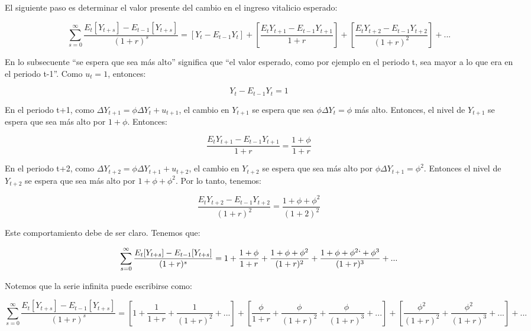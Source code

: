 \documentclass[
]{article}
\begin{document}
El siguiente paso es determinar el valor presente del cambio en el
ingreso vitalicio esperado:

\begin{equation}
\sum^\infty_{s=0}\frac{E_t[Y_{t+s}]-E_{t-1}[Y_{t+s}]}{(1+r)^s}=[Y_t-E_{t-1}Y_t]+[\frac{E_tY_{t+1}-E_{t-1}Y_{t+1}}{1+r}]+[\frac{E_tY_{t+2}-E_{t-1}Y_{t+2}}{(1+r)^2}]+...
\end{equation}

En lo subsecuente ``se espera que sea más alto'' significa que ``el
valor esperado, como por ejemplo en el periodo t, sea mayor a lo que era
en el periodo t-1''. Como \(u_t=1\), entonces:

\begin{equation}
Y_t-E_{t-1}Y_t=1
\end{equation}

En el periodo t+1, como \(\Delta Y_{t+1}=\phi \Delta Y_t + u_{t+1}\), el
cambio en \(Y_{t+1}\) se espera que sea \(\phi \Delta Y_t=\phi\) más
alto. Entonces, el nivel de \(Y_{t+1}\) se espera que sea más alto por
\(1+\phi\). Entonces:

\begin{equation}
\frac{E_tY_{t+1}-E_{t-1}Y_{t+1}}{1+r}=\frac{1+\phi}{1+r}
\end{equation}

En el periodo t+2, como \(\Delta Y_{t+2}=\phi \Delta Y_{t+1}+u_{t+2}\),
el cambio en \(Y_{t+2}\) se espera que sea más alto por
\(\phi \Delta Y_{t+1}=\phi^2\). Entonces el nivel de \(Y_{t+2}\) se
espera que sea más alto por \(1+\phi +\phi^2\). Por lo tanto, tenemos:

\begin{equation}
\frac{E_tY_{t+2}-E_{t-1}Y_{t+2}}{(1+r)^2}=\frac{1+\phi+\phi^2}{(1+2)^2}
\end{equation}

Este comportamiento debe de ser claro. Tenemos que:

\begin{equation}
\sum^\infty_{s=0}\frac{E_t[Y_{t+s}]-E_{t-1}[Y_{t+s}]}{(1+r)^s}=1+\frac{1+\phi}{1+r}+\frac{1+\phi + \phi^2}{(1+r)^2}+\frac{1+\phi+\phi^2`+\phi^3}{(1+r)^3}+...
\end{equation}

Notemos que la serie infinita puede escribirse como:

\begin{equation}
\sum^\infty_{s=0}\frac{E_t[Y_{t+s}]-E_{t-1}[Y_{t+s}]}{(1+r)^s}=[1+\frac{1}{1+r}+\frac{1}{(1+r)^2}+...]+[\frac{\phi}{1+r}+\frac{\phi}{(1+r)^2}+\frac{\phi}{(1+r)^3}+...]+[\frac{\phi^2}{(1+r)^2}+\frac{\phi^2}{(1+r)^3}+...]+...
\end{equation}
\end{document}
